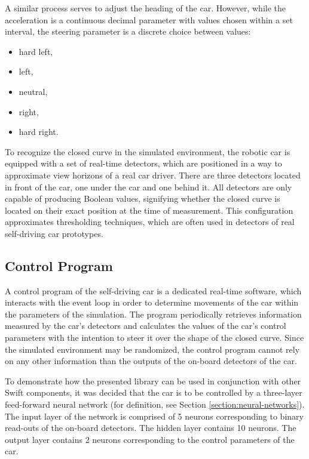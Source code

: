 \todo %

A similar process serves to adjust the heading of the car. However, while the acceleration is a continuous decimal parameter with values chosen within a set interval, the steering parameter is a discrete choice between values:
~
\begin{itemize}
	\item hard left,
	\item left,
	\item neutral,
	\item right,
	\item hard right.
\end{itemize}

To recognize the closed curve in the simulated environment, the robotic car is equipped with a set of real-time detectors, which are positioned in a way to approximate view horizons of a real car driver. There are three detectors located in front of the car, one under the car and one behind it. All detectors are only capable of producing Boolean values, signifying whether the closed curve is located on their exact position at the time of measurement. This configuration approximates thresholding techniques, which are often used in detectors of real self-driving car prototypes.

\subsection{Control Program}
A control program of the self-driving car is a dedicated real-time software, which interacts with the event loop in order to determine movements of the car within the parameters of the simulation. The program periodically retrieves information measured by the car's detectors and calculates the values of the car's control parameters with the intention to steer it over the shape of the closed curve. Since the simulated environment may be randomized, the control program cannot rely on any other information than the outputs of the on-board detectors of the car. 

To demonstrate how the presented library can be used in conjunction with other Swift components, it was decided that the car is to be controlled by a three-layer feed-forward neural network (for definition, see Section \ref{section:neural-networks}). The input layer of the network is comprised of 5 neurons corresponding to binary read-outs of the on-board detectors. The hidden layer contains 10 neurons. The output layer contains 2 neurons corresponding to the control parameters of the car.

